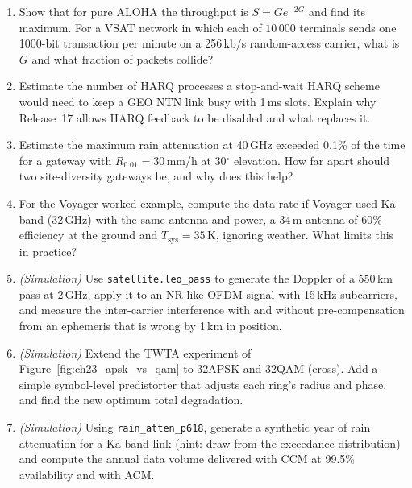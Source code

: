 \begin{enumerate}[label=\thechapter.\arabic*]
\item Show that for pure ALOHA the throughput is $S=Ge^{-2G}$ and find its maximum. For a VSAT
network in which each of $10\,000$ terminals sends one 1000-bit transaction per minute on
a 256\,kb/s random-access carrier, what is $G$ and what fraction of packets collide?
\item Estimate the number of HARQ processes a stop-and-wait HARQ scheme would need to keep a GEO
NTN link busy with 1\,ms slots. Explain why Release~17 allows HARQ feedback to be disabled and what
replaces it.
\item Estimate the maximum rain attenuation at 40\,GHz exceeded 0.1\% of the time for a gateway with
$R_{0.01}=30$\,mm/h at 30$^\circ$ elevation. How far apart should two site-diversity gateways be,
and why does this help?
\item For the Voyager worked example, compute the data rate if Voyager used Ka-band (32\,GHz) with the
same antenna and power, a 34\,m antenna of 60\% efficiency at the ground and $T_{\text{sys}}=35$\,K,
ignoring weather. What limits this in practice?
\item \emph{(Simulation)} Use \texttt{satellite.leo\_pass} to generate the Doppler of a 550\,km pass at
2\,GHz, apply it to an NR-like OFDM signal with 15\,kHz subcarriers, and measure the
inter-carrier interference with and without pre-compensation from an ephemeris that is wrong by
1\,km in position.
\item \emph{(Simulation)} Extend the TWTA experiment of Figure~\ref{fig:ch23_apsk_vs_qam} to 32APSK
and 32QAM (cross). Add a simple symbol-level predistorter that adjusts each ring's radius and phase,
and find the new optimum total degradation.
\item \emph{(Simulation)} Using \texttt{rain\_atten\_p618}, generate a synthetic year of rain
attenuation for a Ka-band link (hint: draw from the exceedance distribution) and compute the
annual data volume delivered with CCM at 99.5\% availability and with ACM.
\end{enumerate}

